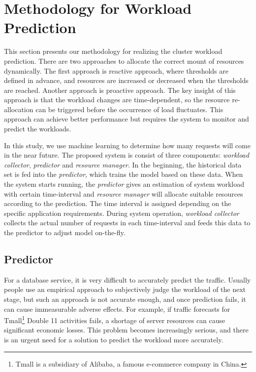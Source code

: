 \section{Methodology for Workload Prediction}

This section presents our methodology for realizing the cluster workload
prediction. There are two approaches to allocate the correct mount
of resources dynamically. The first approach is reactive approach, where thresholds are
defined in advance, and resources are increased or decreased when the thresholds
are reached. Another approach is proactive approach. The key insight of this
approach is that the workload changes are time-dependent, so the resource
re-allocation can be triggered before the occurrence of load fluctuates. This
approach can achieve better performance but requires the system to monitor and
predict the workloads.

In this study, we use machine learning to determine how many requests will come
in the near future. The proposed system is consist of three components:
\textit{workload collector}, \textit{predictor} and \textit{resource manager}.
In the beginning, the historical data set is fed into the \textit{predictor}, which
trains the model based on these data. When the system starts running, the
\textit{predictor} gives an estimation of system workload with certain
time-interval and \textit{resource manager} will allocate suitable resources
according to the prediction. The time interval is assigned depending on the
specific application requirements. During system operation, \textit{workload
collector} collects the actual number of requests in each time-interval and feeds
this data to the predictor to adjust model on-the-fly. 

\subsection{Predictor}

For a database service, it is very difficult to accurately predict the traffic.
Usually people use an empirical approach to subjectively judge the workload of
the next stage, but such an approach is not accurate enough, and once prediction
fails, it can cause immeasurable adverse effects. For example, if traffic
forecasts for Tmall\footnote{Tmall is a subsidiary of Alibaba, a famous
e-commerce company in China.} Double 11 activities fails, a shortage of server
resources can cause significant economic losses. This problem becomes
increasingly serious, and there is an urgent need for a solution to predict the
workload more accurately.

